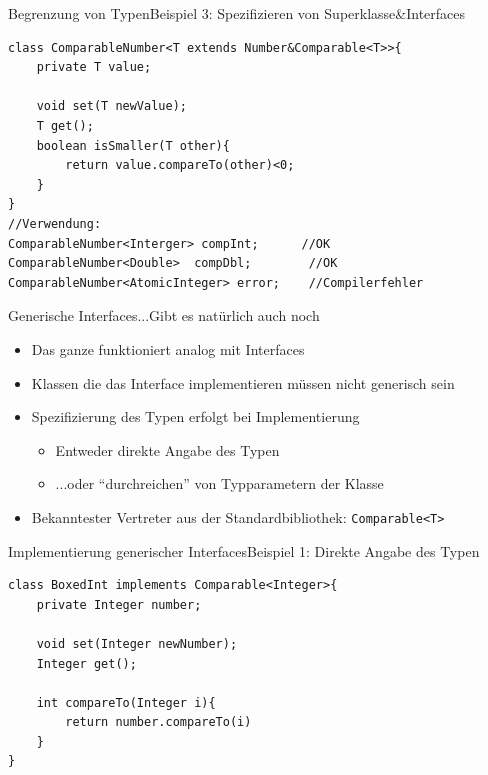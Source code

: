 \begin{frame}[fragile]{Begrenzung von Typen}{Beispiel 3: Spezifizieren von Superklasse\&Interfaces}
\lstset{style=java}
\begin{lstlisting}
class ComparableNumber<T extends Number&Comparable<T>>{
    private T value;
    
    void set(T newValue);
    T get();
    boolean isSmaller(T other){
        return value.compareTo(other)<0;
    }
}
//Verwendung:
ComparableNumber<Interger> compInt;      //OK
ComparableNumber<Double>  compDbl;        //OK
ComparableNumber<AtomicInteger> error;    //Compilerfehler
\end{lstlisting}
\end{frame}


\begin{frame}{Generische Interfaces}{...Gibt es natürlich auch noch}
    \begin{itemize}
        \item Das ganze funktioniert analog mit Interfaces
        \item Klassen die das Interface implementieren müssen nicht generisch sein
        \item Spezifizierung des Typen erfolgt bei Implementierung
        \begin{itemize}
            \item Entweder direkte Angabe des Typen
            \item ...oder "`durchreichen"' von Typparametern der Klasse
        \end{itemize}
        \item Bekanntester Vertreter aus der Standardbibliothek: \texttt{Comparable<T>}
    \end{itemize}
\end{frame}

\begin{frame}[fragile]{Implementierung generischer Interfaces}{Beispiel 1: Direkte Angabe des Typen}
\lstset{style=java}
\begin{lstlisting}
class BoxedInt implements Comparable<Integer>{
    private Integer number;
    
    void set(Integer newNumber);
    Integer get();
    
    int compareTo(Integer i){
        return number.compareTo(i)
    }
}
\end{lstlisting}
\end{frame}

